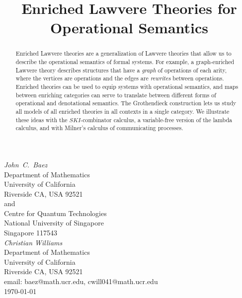 \documentclass{amsart}
\theoremstyle{definition}
\begin{document}
\title{Enriched Lawvere Theories 
for Operational Semantics \\}

\maketitle
\begin{center}   
  {\em John\ C.\ Baez \\}
  \vspace{0.3cm}
  {\small
 Department of Mathematics \\
    University of California \\
  Riverside CA, USA 92521 \\ and \\
 Centre for Quantum Technologies  \\
    National University of Singapore \\
    Singapore 117543  \\    } 
  \vspace{0.4cm}
{\em Christian Williams \\}
\vspace{0.3cm}
   {\small
   Department of Mathematics \\
  University of California \\
  Riverside CA, USA 92521 \\}
  \vspace{0.3cm}   
  {\small email:  baez@math.ucr.edu, cwill041@math.ucr.edu\\} 
  \vspace{0.3cm}   
  {\small \today}
  \vspace{0.3cm}   
\end{center} 

\begin{abstract} 
Enriched Lawvere theories are a generalization of Lawvere theories that allow us to describe the operational semantics of formal systems.  For example, a graph-enriched Lawvere theory describes structures that have a \emph{graph} of operations of each arity, where the vertices are operations and the edges are \emph{rewrites} between operations. Enriched theories can be used to equip systems with operational semantics, and maps between enriching categories can serve to translate between different forms of operational and denotational semantics.  The Grothendieck construction lets us study all models of all enriched theories
in all contexts in a single category.  We illustrate these ideas with the $SKI$-combinator calculus, a variable-free version of the lambda calculus, and with Milner's calculus of communicating processes.
\end{abstract}
\end{document}
